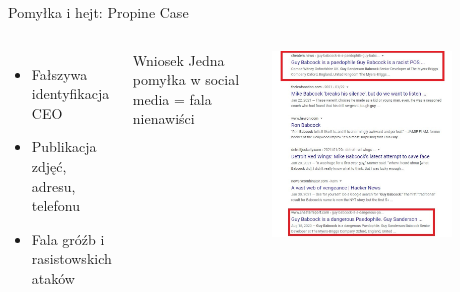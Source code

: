 \begin{frame}{Pomyłka i hejt: Propine Case}
\begin{columns}[c]
    \begin{itemize}
      \item Fałszywa identyfikacja CEO
      \item Publikacja zdjęć, adresu, telefonu
      \item Fala gróźb i rasistowskich ataków
    \end{itemize}
    \begin{alertblock}{Wniosek}
    Jedna pomyłka w social media = fala nienawiści
    \end{alertblock}
    \includegraphics[width=0.75\textwidth]{images/pedophile.jpg}
\end{columns}
\end{frame}

